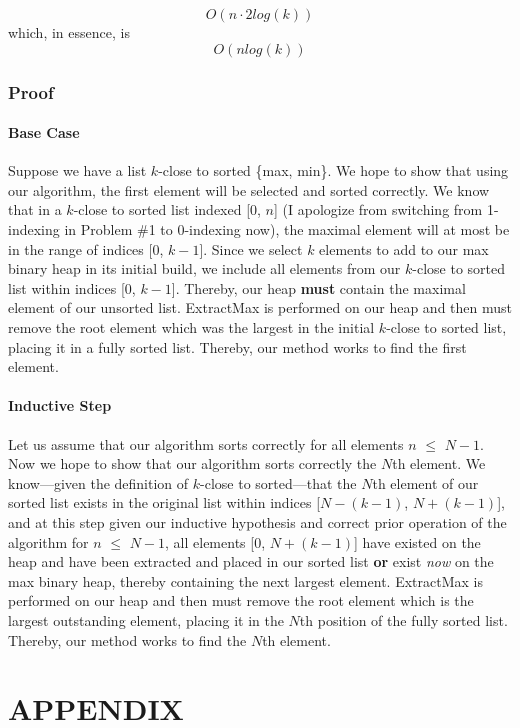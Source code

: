 \documentclass[conference]{styles/acmsiggraph}
\newcommand{\?}{\stackrel{?}{=}}
\newcommand\subsubsubsection{\paragraph}
\begin{document}
$$O(n \cdot 2log(k))$$ 
which, in essence, is 
$$O(nlog(k))$$

\subsubsection{Proof}
\subsubsubsection{Base Case}
Suppose we have a list $k$-close to sorted \{max, min\}.  We hope to show that using our algorithm, the first element will be selected and sorted correctly.  We know that in a $k$-close to sorted list indexed [0, $n$] (I apologize from switching from 1-indexing in Problem \#1 to 0-indexing now), the maximal element will at most be in the range of indices [0, $k-1$].  Since we select $k$ elements to add to our max binary heap in its initial build, we include all elements from our $k$-close to sorted list within indices [0, $k-1$].  Thereby, our heap \textbf{must} contain the maximal element of our unsorted list.  ExtractMax is performed on our heap and then must remove the root element which was the largest in the initial $k$-close to sorted list, placing it in a fully sorted list.  Thereby, our method works to find the first element.

\subsubsubsection{Inductive Step}
Let us assume that our algorithm sorts correctly for all elements $n$ $\leq$ $N-1$.  Now we hope to show that our algorithm sorts correctly the $N$th element.  We know---given the definition of $k$-close to sorted---that the $N$th element of our sorted list exists in the original list within indices [$N-(k-1)$, $N+(k-1)$], and at this step given our inductive hypothesis and correct prior operation of the algorithm for $n$ $\leq$ $N-1$, all elements [0, $N+(k-1)$] have existed on the heap and have been extracted and placed in our sorted list \textbf{or} exist \textit{now} on the max binary heap, thereby containing the next largest element.  ExtractMax is performed on our heap and then must remove the root element which is the largest outstanding element, placing it in the $N$th position of the fully sorted list.  Thereby, our method works to find the $N$th element. 






\newpage
\section{APPENDIX} \label{APPENDIX}
\end{document}
